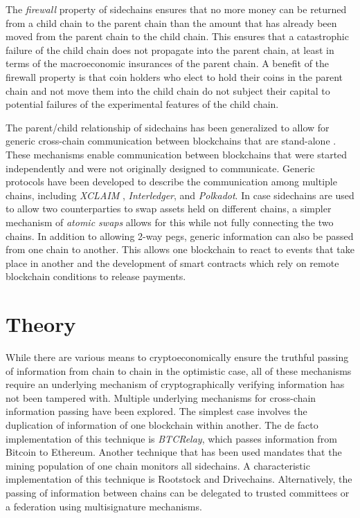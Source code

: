\documentclass[runningheads]{format/llncs}
\begin{document}
The \emph{firewall} property of sidechains ensures that no more money can be returned from a child chain to the parent chain than the amount that has already been moved from the parent chain to the child chain. This ensures that a catastrophic failure of the child chain does not propagate into the parent chain, at least in terms of the macroeconomic insurances of the parent chain. A benefit of the firewall property is that coin holders who elect to hold their coins in the parent chain and not move them into the child chain do not subject their capital to potential failures of the experimental features of the child chain.

The parent/child relationship of sidechains has been generalized to allow for generic cross-chain communication between blockchains that are stand-alone \cite{crosschain-sok}. These mechanisms enable communication between blockchains that were started independently and were not originally designed to communicate. Generic protocols have been developed to describe the communication among multiple chains, including \emph{XCLAIM} \cite{xclaim}, \emph{Interledger}, and \emph{Polkadot}. In case sidechains are used to allow two counterparties to swap assets held on different chains, a simpler mechanism of \emph{atomic swaps} allows for this while not fully connecting the two chains. In addition to allowing 2-way pegs, generic information can also be passed from one chain to another. This allows one blockchain to react to events that take place in another \cite{pow-sidechains} and the development of smart contracts which rely on remote blockchain conditions to release payments.

\section*{Theory}
While there are various means to cryptoeconomically ensure the truthful passing of information from chain to chain in the optimistic case, all of these mechanisms require an underlying mechanism of cryptographically verifying information has not been tampered with. Multiple underlying mechanisms for cross-chain information passing have been explored. The simplest case involves the duplication of information of one blockchain within another. The de facto implementation of this technique is \emph{BTCRelay}, which passes information from Bitcoin to Ethereum. Another technique that has been used mandates that the mining population of one chain monitors all sidechains. A characteristic implementation of this technique is Rootstock and Drivechains. Alternatively, the passing of information between chains can be delegated to trusted committees or a federation using multisignature mechanisms.
\end{document}
